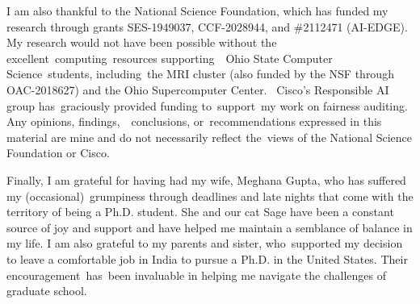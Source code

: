 I am also thankful to the National Science Foundation, which has funded my research through grants SES-1949037, CCF-2028944, and \#2112471 (AI-EDGE).
My research would not have been possible without the excellent computing resources supporting  Ohio State Computer Science students, including the MRI cluster (also funded by the NSF through OAC-2018627) and the Ohio Supercomputer Center. 
Cisco's Responsible AI group has graciously provided funding to support my work on fairness auditing.
Any opinions, findings,  conclusions, or recommendations expressed in this material are mine and do not necessarily reflect the views of the National Science Foundation or Cisco.

Finally, I am grateful for having had my wife, Meghana Gupta, who has suffered my (occasional) grumpiness through deadlines and late nights that come with the territory of being a Ph.D. student.
She and our cat Sage have been a constant source of joy and support and have helped me maintain a semblance of balance in my life.
I am also grateful to my parents and sister, who supported my decision to leave a comfortable job in India to pursue a Ph.D. in the United States.
Their encouragement has been invaluable in helping me navigate the challenges of graduate school.

